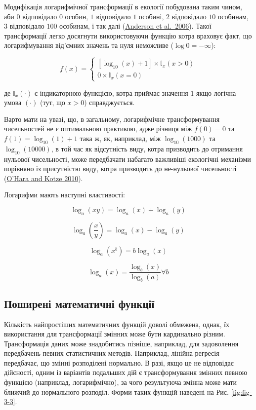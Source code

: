\documentclass[
  11pt,
]{book}
\begin{document}
Модифікація логарифмічної трансформації в екології побудована таким чином, аби \(0\) відповідало \(0\) особин, \(1\) відповідало \(1\) особині, \(2\) відповідало \(10\) особинам, \(3\) відповідало \(100\) особинам, і так далі (\href{https://doi.org/10.1111/j.1461-0248.2006.00926.x}{Anderson et al.~2006}). Такої трансформації легко досягнути використовуючи функцію котра враховує факт, що логарифмування від'ємних значень та нуля неможливе (\(\log0 = -\infty\)):

\[f(x) = \begin{cases}
[\log_{10}(x)+1] \times \mathbb{I}_x(x > 0)\\
0 \times \mathbb{I}_x(x = 0)
\end{cases}\]

де \(\mathbb{I}_x(\cdot)\) є індикаторною функцією, котра приймає значення \(1\) якщо логічна умова \((\cdot)\) (тут, що \(x > 0\)) справджується.

Варто мати на увазі, що, в загальному, логарифмічне трансформування чисельностей не є оптимальною практикою, адже різниця між \(f(0) = 0\) та \(f(1) = \log_{10}(1)+1\) така ж, як, наприклад, між \(\log_{10}(1000)\) та \(\log_{10}(10000)\), в той час як відсутність виду, котра призводить до отримання нульової чисельності, може передбачати набагато важливіші екологічні механізми порівняно із присутністю виду, котра призводить до не-нульової чисельності (\href{https://doi.org/10.1111/j.2041-210X.2010.00021.x}{O'Hara and Kotze 2010}).

Логарифми мають наступні властивості:

\[\log_a(xy) = \log_a(x) + \log_a(y)\]

\[\log_a(\frac{x}{y}) = \log_a(x) - \log_a(y)\]

\[\log_a(x^b) = b \log_a (x)\]

\[\log_a(x) = \frac{\log_b (x)}{\log_b (a)} \forall b\]

\subsection{Поширені математичні функції}\label{ux43fux43eux448ux438ux440ux435ux43dux456-ux43cux430ux442ux435ux43cux430ux442ux438ux447ux43dux456-ux444ux443ux43dux43aux446ux456ux457}

Кількість найпростіших математичних функцій доволі обмежена, однак, їх використання для трансформації змінних може бути кардинально різним. Трансформація даних може знадобитись пізніше, наприклад, для задоволення передбачень певних статистичних методів. Наприклад, лінійна регресія передбачає, що змінні розподілені нормально. В разі, якщо це не відповідає дійсності, одним із варіантів подальших дій є трансформування змінних певною функцією (наприклад, логарифмічно), за чого результуюча змінна може мати ближчий до нормального розподіл. Форми таких функцій наведені на Рис. \ref{fig:fig-3-3}.
\end{document}
